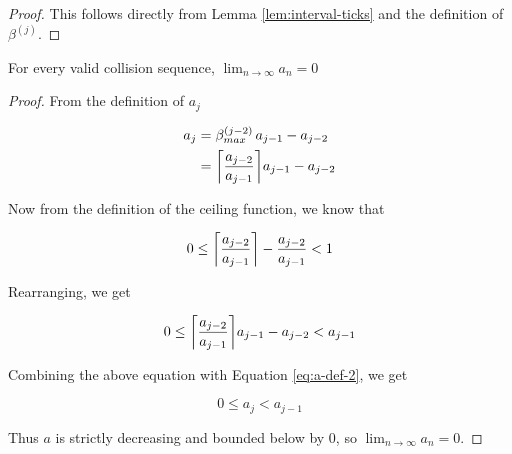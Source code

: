 \begin{proof}
	This follows directly from Lemma \ref{lem:interval-ticks} and the definition of $\beta^{(j)}$.
\end{proof}


\begin{theorem}
	For every valid collision sequence, ${\displaystyle \lim_{n \to \infty} a_n = 0}$
\end{theorem}

\begin{proof}
	From the definition of $a_j$

	\begin{align}\label{eq:a-def-2}
		a_j& = \beta^{(j-2)}_{max} \, a_{j-1} - a_{j-2}\\
		& =  \ceil{\frac{a_{j-2}}{a_{j-1}}} a_{j-1} - a_{j-2}
	\end{align}

	Now from the definition of the ceiling function, we know that

	\begin{equation}
		0 \le \ceil{\frac{a_{j-2}}{a_{j-1}}} - \frac{a_{j-2}}{a_{j-1}} < 1
	\end{equation}

	Rearranging, we get

	\begin{equation}
		0 \le \ceil{\frac{a_{j-2}}{a_{j-1}}} a_{j-1} - a_{j-2} < a_{j-1}
	\end{equation}

	Combining the above equation with Equation \ref{eq:a-def-2}, we get

	\begin{equation}
		0 \le a_j < a_{j-1}
	\end{equation}

	Thus $a$ is strictly decreasing and bounded below by 0, so ${\displaystyle \lim_{n \to \infty} a_n = 0}$.
\end{proof}
